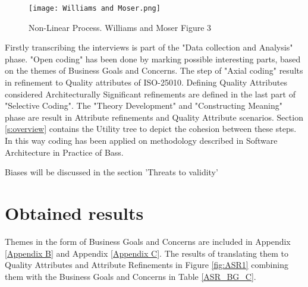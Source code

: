 \graphicspath{ {./images/} }
\begin{figure}
\centering
\label{fig:WM2019}
\texttt{[image: Williams and Moser.png]}\\
\caption{Non-Linear Process. Williams and Moser \cite{Williams2019TheAO} Figure 3}
\end{figure}

Firstly transcribing the interviews is part of the "Data collection and Analysis" phase. "Open coding" has been done by marking possible interesting parts, based on the themes of Business Goals and Concerns. The step of "Axial coding" results in refinement to Quality attributes of ISO-25010. Defining Quality Attributes considered Architecturally Significant refinements are defined in the last part of "Selective Coding". The "Theory Development" and "Constructing Meaning" phase are result in Attribute refinements and Quality Attribute scenarios. Section \ref{s:overview} contains the Utility tree to depict the cohesion between these steps. In this way coding has been applied on methodology described in Software Architecture in Practice of Bass\etal \cite{Bass2015SoftwareAI}.

Biases will be discussed in the section 'Threats to validity'

\section{Obtained results}
Themes in the form of Business Goals and Concerns are included in Appendix \ref{Appendix B} and Appendix \ref{Appendix C}. The results of translating them to Quality Attributes and Attribute Refinements in Figure \ref{fig:ASR1} combining them with the Business Goals and Concerns in Table \ref{ASR_BG_C}.




